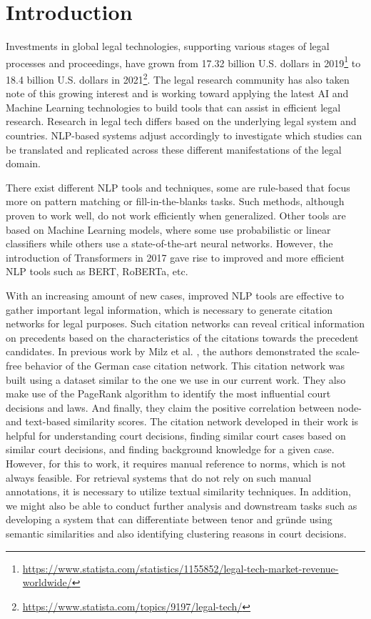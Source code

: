 \documentclass[runningheads]{llncs}
\begin{document}
\section{Introduction}
\label{sec:introduction}

Investments in global legal technologies, supporting various stages of legal processes and proceedings, have grown from 17.32 billion U.S. dollars in 2019\footnote{\url{https://www.statista.com/statistics/1155852/legal-tech-market-revenue-worldwide/}} to 18.4 billion U.S. dollars in 2021\footnote{\url{https://www.statista.com/topics/9197/legal-tech/}}. The legal research community has also taken note of this growing interest and is working toward applying the latest AI and Machine Learning technologies to build tools that can assist in efficient legal research. Research in legal tech differs based on the underlying legal system and countries. NLP-based systems adjust accordingly to investigate which studies can be translated and replicated across these different manifestations of the legal domain.

There exist different NLP tools and techniques, some are rule-based that focus more on pattern matching or fill-in-the-blanks tasks. Such methods, although proven to work well, do not work efficiently when generalized. Other tools are based on Machine Learning models, where some use probabilistic or linear classifiers while others use a state-of-the-art neural networks. However, the introduction of Transformers\cite{vaswani2017attention} in 2017 gave rise to improved and more efficient NLP tools such as BERT\cite{devlin2018bert}, RoBERTa\cite{liu2019roberta}, etc.

With an increasing amount of new cases, improved NLP tools are effective to gather important legal information, which is necessary to generate citation networks for legal purposes. Such citation networks can reveal critical information on precedents \cite{Cross2010CITATIONSSIGNIFICANCE} based on the characteristics of the citations towards the precedent candidates. In previous work by Milz et al. \cite{milz2021analysis}, the authors demonstrated the scale-free behavior of the German case citation network. This citation network was built using a dataset similar to the one we use in our current work. They also make use of the PageRank algorithm to identify the most influential court decisions and laws. And finally, they claim the positive correlation between node- and text-based similarity scores. The citation network developed in their work is helpful for understanding court decisions, finding similar court cases based on similar court decisions, and finding background knowledge for a given case. However, for this to work, it requires manual reference to norms, which is not always feasible. For retrieval systems that do not rely on such manual annotations, it is necessary to utilize textual similarity techniques. In addition, we might also be able to conduct further analysis and downstream tasks such as developing a system that can differentiate between tenor and gründe using semantic similarities and also identifying clustering reasons in court decisions.
\end{document}
